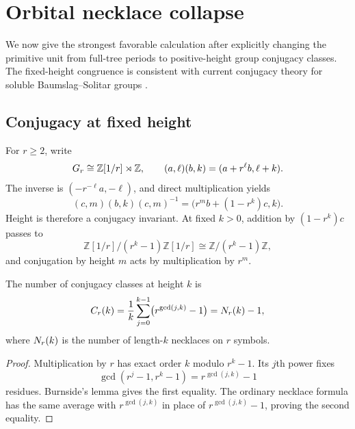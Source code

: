 \section{Orbital necklace collapse}
\label{sec:orbital}

We now give the strongest favorable calculation after explicitly changing
the primitive unit from full-tree periods to positive-height group conjugacy
classes.  The fixed-height congruence is consistent with current conjugacy
theory for soluble Baumslag--Solitar groups
\citep{ciobanu2020conjugacy,guo2026conjugacy}.

\subsection{Conjugacy at fixed height}

For $r\ge2$, write
\begin{equation}
  G_r\cong\mathbb Z[1/r]\rtimes\mathbb Z,
  \qquad
  (a,\ell)(b,k)=(a+r^\ell b,\ell+k).
  \label{eq:semidirect}
\end{equation}
The inverse is $(-r^{-\ell}a,-\ell)$, and direct multiplication yields
\begin{equation}
  (c,m)(b,k)(c,m)^{-1}
  =\bigl(r^m b+(1-r^k)c,k\bigr).
  \label{eq:conjugation}
\end{equation}
Height is therefore a conjugacy invariant.  At fixed $k>0$, addition by
$(1-r^k)c$ passes to
\[
  \mathbb Z[1/r]/(r^k-1)\mathbb Z[1/r]
  \cong \mathbb Z/(r^k-1)\mathbb Z,
\]
and conjugation by height $m$ acts by multiplication by $r^m$.

\begin{proposition}
\label{prop:burnside}
The number of conjugacy classes at height $k$ is
\begin{equation}
  C_r(k)=\frac1k\sum_{j=0}^{k-1}
  \bigl(r^{\gcd(j,k)}-1\bigr)=N_r(k)-1,
  \label{eq:class-count}
\end{equation}
where $N_r(k)$ is the number of length-$k$ necklaces on $r$ symbols.
\end{proposition}

\begin{proof}
Multiplication by $r$ has exact order $k$ modulo $r^k-1$.  Its $j$th power
fixes
\[
  \gcd(r^j-1,r^k-1)=r^{\gcd(j,k)}-1
\]
residues.  Burnside's lemma gives the first equality.  The ordinary necklace
formula has the same average with $r^{\gcd(j,k)}$ in place of
$r^{\gcd(j,k)}-1$, proving the second equality.
\end{proof}

